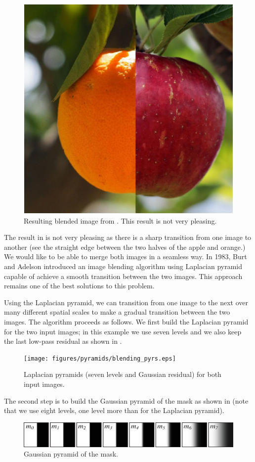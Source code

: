 \begin{figure}[h!]
\centerline{
\includegraphics[width=0.30\linewidth]{figures/pyramids/apple_orange_mask_8levels.jpg}
}
\caption{Resulting blended image from \fig{\ref{fig:orange_apple_mask}}. This result is not very pleasing.}
\label{fig:orange_apple_mask_bad_result}
\end{figure}

The result in \fig{\ref{fig:orange_apple_mask_bad_result}} is not very pleasing as there is a sharp transition from one image to another (see the straight edge between the two halves of the apple and orange.) We would like to be able to merge both images in a seamless way. In 1983, Burt and Adelson \cite{Burt83} introduced an image blending algorithm using Laplacian pyramid capable of achieve a smooth transition between the two images. This approach remains one of the best solutions to this problem.

Using the Laplacian pyramid, we can transition from one image to the next over many different spatial scales to make a gradual transition between the two images. The algorithm proceeds as follows. We first build the Laplacian pyramid for the two input images; in this example we use seven levels and we also keep the last low-pass residual as shown in \fig{\ref{fig:blending_pyrs}}.

\begin{figure}[h!]
\centerline{
\texttt{[image: figures/pyramids/blending\_pyrs.eps]}
}
\caption{Laplacian pyramids (seven levels and Gaussian residual) for both input images.}
\label{fig:blending_pyrs}
\end{figure}

The second step is to build the Gaussian pyramid of the mask as shown in \fig{\ref{fig:blending_pyrs_mask}} (note that we use eight levels, one level more than for the Laplacian pyramid).
\begin{figure}[h!]
\centerline{
\includegraphics[width=0.9\linewidth]{figures/pyramids/blending_pyrs_mask.eps}
}
\caption{Gaussian pyramid of the mask.}
\label{fig:blending_pyrs_mask}
\end{figure}

